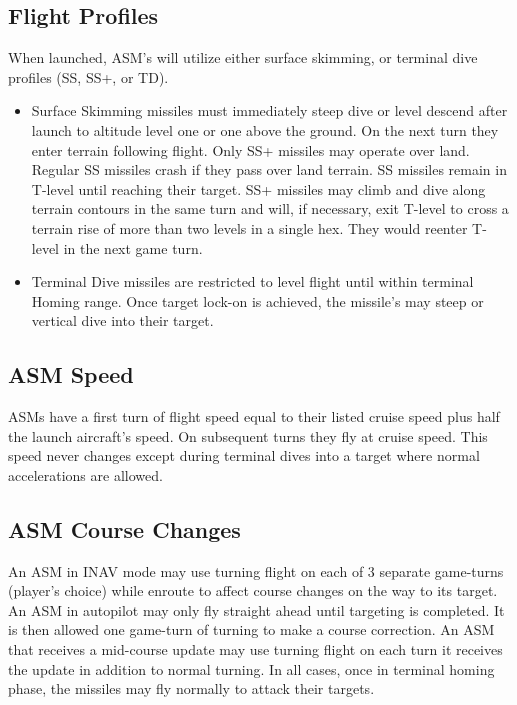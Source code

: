 \begin{advancedrules}
\begin{itemize}
    \end{itemize}

    \subsection{Flight Profiles} When launched, ASM's will utilize either surface skimming, or terminal dive profiles (SS, SS+, or TD).

    \begin{itemize}

        \item Surface Skimming missiles must immediately steep dive or level descend after launch to altitude level one or one above the ground. On the next turn they enter terrain following flight. Only SS+ missiles may operate over land. Regular SS missiles crash if they pass over land terrain. SS missiles remain in T-level until reaching their target. SS+ missiles may climb and dive along terrain contours in the same turn and will, if necessary, exit T-level to cross a terrain rise of more than two levels in a single hex. They would reenter T-level in the next game turn.

        \item Terminal Dive missiles are restricted to level flight until within terminal Homing range. Once target lock-on is achieved, the missile's may steep or vertical dive into their target.

    \end{itemize}

    \subsection{ASM Speed} ASMs have a first turn of flight speed equal to their listed cruise speed plus half the launch aircraft's speed. On subsequent turns they fly at cruise speed. This speed never changes except during terminal dives into a target where normal accelerations are allowed.

    \subsection{ASM Course Changes} An ASM in INAV mode may use turning flight on each of 3 separate game-turns (player's choice) while enroute to affect course changes on the way to its target. An ASM in autopilot may only fly straight ahead until targeting is completed. It is then allowed one game-turn of turning to make a course correction. An ASM that receives a mid-course update may use turning flight on each turn it receives the update in addition to normal turning. In all cases, once in terminal homing phase, the missiles may fly normally to attack their targets.


\end{advancedrules}
